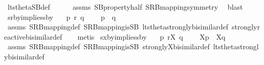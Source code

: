\begin{isabellebody}
\ lts{\isacharunderscore}{\kern0pt}theta{\isachardot}{\kern0pt}SB{\isacharunderscore}{\kern0pt}def\isanewline
\ \ \ \ \isamarkupfalse%
\ assms\ SB{\isacharunderscore}{\kern0pt}property{\isacharunderscore}{\kern0pt}half\ SRB{\isacharunderscore}{\kern0pt}mapping{\isacharunderscore}{\kern0pt}symmetry\ \isamarkupfalse%
\ blast\isanewline
{}\isamarkupfalse%
%
\endisatagproof
{\isafoldproof}%
%
\isadelimproof
\isanewline
%
\endisadelimproof
\isanewline
{}\isamarkupfalse%
\ srby{\isacharunderscore}{\kern0pt}implies{\isacharunderscore}{\kern0pt}sby{\isacharcolon}{\kern0pt}\isanewline
\ \ \ {\isacartoucheopen}p\ {\isasymleftrightarrow}\isactrlsub r\ q{\isacartoucheclose}\ \isanewline
\ \ \ {\isacartoucheopen}{\isasymtheta}{\isacharparenleft}{\kern0pt}p{\isacharparenright}{\kern0pt}\ {\isasymleftrightarrow}\ {\isasymtheta}{\isacharparenleft}{\kern0pt}q{\isacharparenright}{\kern0pt}{\isacartoucheclose}\isanewline
%
\isadelimproof
\ \ %
\endisadelimproof
%
\isatagproof
{}\isamarkupfalse%
\ assms\ SRB{\isacharunderscore}{\kern0pt}mapping{\isacharunderscore}{\kern0pt}def\ SRB{\isacharunderscore}{\kern0pt}mapping{\isacharunderscore}{\kern0pt}is{\isacharunderscore}{\kern0pt}SB\ lts{\isacharunderscore}{\kern0pt}theta{\isachardot}{\kern0pt}strongly{\isacharunderscore}{\kern0pt}bisimilar{\isacharunderscore}{\kern0pt}def\ strongly{\isacharunderscore}{\kern0pt}reactive{\isacharunderscore}{\kern0pt}bisimilar{\isacharunderscore}{\kern0pt}def\isanewline
\ \ \isamarkupfalse%
\ metis%
\endisatagproof
{\isafoldproof}%
%
\isadelimproof
\isanewline
%
\endisadelimproof
{}\isamarkupfalse%
\ sxby{\isacharunderscore}{\kern0pt}implies{\isacharunderscore}{\kern0pt}sby{\isacharcolon}{\kern0pt}\isanewline
\ \ \ {\isacartoucheopen}p\ {\isasymleftrightarrow}\isactrlsub r\isactrlsup X\ q{\isacartoucheclose}\ \isanewline
\ \ \ {\isacartoucheopen}{\isasymtheta}{\isacharbrackleft}{\kern0pt}X{\isacharbrackright}{\kern0pt}{\isacharparenleft}{\kern0pt}p{\isacharparenright}{\kern0pt}\ {\isasymleftrightarrow}\ {\isasymtheta}{\isacharbrackleft}{\kern0pt}X{\isacharbrackright}{\kern0pt}{\isacharparenleft}{\kern0pt}q{\isacharparenright}{\kern0pt}{\isacartoucheclose}\isanewline
%
\isadelimproof
\ \ %
\endisadelimproof
%
\isatagproof
{}\isamarkupfalse%
\ assms\ SRB{\isacharunderscore}{\kern0pt}mapping{\isacharunderscore}{\kern0pt}def\ SRB{\isacharunderscore}{\kern0pt}mapping{\isacharunderscore}{\kern0pt}is{\isacharunderscore}{\kern0pt}SB\ strongly{\isacharunderscore}{\kern0pt}X{\isacharunderscore}{\kern0pt}bisimilar{\isacharunderscore}{\kern0pt}def\ lts{\isacharunderscore}{\kern0pt}theta{\isachardot}{\kern0pt}strongly{\isacharunderscore}{\kern0pt}bisimilar{\isacharunderscore}{\kern0pt}def\isanewline

\end{isabellebody}
